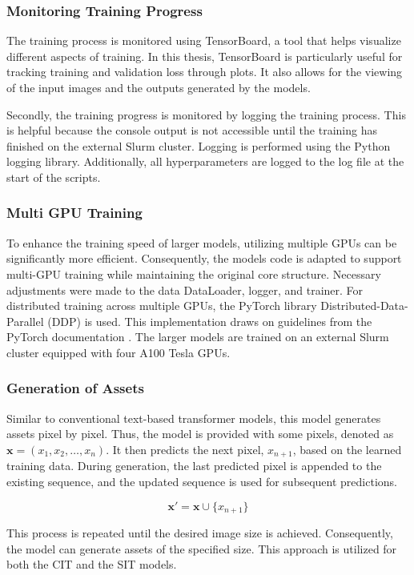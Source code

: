     \subsubsection{Monitoring Training Progress}
    
    The training process is monitored using TensorBoard, a tool that helps visualize different aspects of training. In this thesis, TensorBoard is particularly useful for tracking training and validation loss through plots. It also allows for the viewing of the input images and the outputs generated by the models.

    Secondly, the training progress is monitored by logging the training process. This is helpful because the console output is not accessible until the training has finished on the external Slurm cluster. Logging is performed using the Python logging library. Additionally, all hyperparameters are logged to the log file at the start of the scripts.



    \subsubsection{Multi GPU Training}
    
    To enhance the training speed of larger models, utilizing multiple GPUs can be significantly more efficient. Consequently, the models code is adapted to support multi-GPU training while maintaining the original core structure. Necessary adjustments were made to the data DataLoader, logger, and trainer. For distributed training across multiple GPUs, the PyTorch library Distributed-Data-Parallel (DDP) is used. This implementation draws on guidelines from the PyTorch documentation \autocite{Subramanian2023}. The larger models are trained on an external Slurm cluster equipped with four A100 Tesla GPUs.

    \subsubsection{Generation of Assets}

    Similar to conventional text-based transformer models, this model generates assets pixel by pixel. Thus, the model is provided with some pixels, denoted as \(\mathbf{x} = (x_1, x_2, \ldots, x_n)\). It then predicts the next pixel, \(x_{n+1}\), based on the learned training data. During generation, the last predicted pixel is appended to the existing sequence, and the updated sequence is used for subsequent predictions.

    \[
        \mathbf{x}' = \mathbf{x} \cup \{x_{n+1}\}
    \]
    
    This process is repeated until the desired image size is achieved. Consequently, the model can generate assets of the specified size. This approach is utilized for both the CIT and the SIT models.
